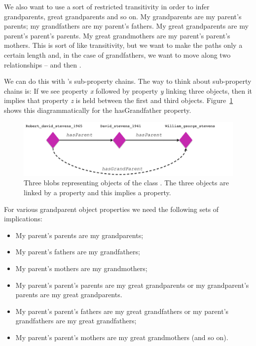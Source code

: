 We also want to use a sort of restricted transitivity in order to infer grandparents, great grandparents and so on. My grandparents are my parent's parents; my grandfathers are my parent's fathers. My great grandparents are my parent's parent's parents. My great grandmothers are my parent's parent's mothers. This is sort of like transitivity, but we want to make the paths only a certain length and, in the case of grandfathers, we want to move along two relationships --  and then .

We can do this with \owlii's sub-property chains. The way to think about sub-property chains is: If we see property \emph{x} followed by property \emph{y} linking three objects, then it implies that property \emph{z} is held between the first and third objects. Figure~\ref{fig:chain_triangle} shows this diagrammatically for the hasGrandfather property.

\begin{figure}
\begin{center}
\includegraphics[width=\figwidth]{figures/grandparent}\caption{Three blobs representing objects of the class \person. The three objects are linked by a  property and this implies a  property.}\label{fig:chain_triangle}
\end{center}
\end{figure}

For various grandparent object properties we need the following sets of implications:
\begin{itemize}
\item My parent's parents are my grandparents;
\item My parent's fathers are my grandfathers;
\item My parent's mothers are my grandmothers;
\item My parent's parent's parents are my great grandparents or my grandparent's parents are my great grandparents.
\item My parent's parent's fathers are my great grandfathers or my parent's grandfathers are my great grandfathers;
\item My parent's parent's mothers are my great grandmothers (and so on).
\end{itemize}

